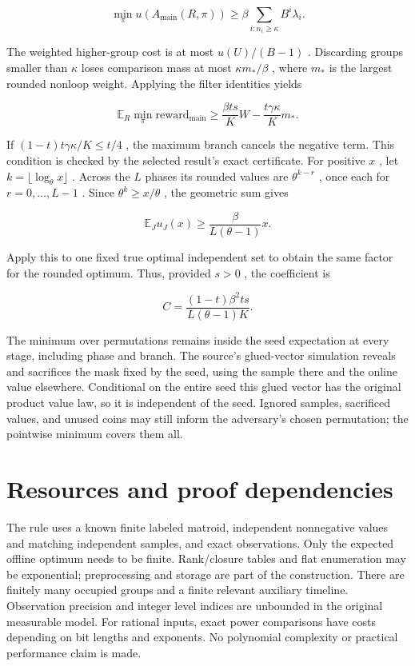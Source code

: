 \documentclass[11pt]{article}
\begin{document}
\[\min_\pi u(A_{\mathrm{main}}(R,\pi))
\ge\beta\sum_{i:n_i\ge\kappa}B^i\lambda_i.\]

The weighted higher-group cost is at most \(u(U)/(B-1)\) . Discarding groups smaller than \(\kappa\) loses comparison mass at most \(\kappa m_*/\beta\) , where \(m_*\) is the largest rounded nonloop weight. Applying the filter identities yields

\[\mathbb E_R\min_\pi\mathrm{reward}_{\mathrm{main}}
\ge\frac{\beta t s}{K}W-\frac{t\gamma\kappa}{K}m_*.\]

If \((1-t)t\gamma\kappa/K\le t/4\) , the maximum branch cancels the negative term. This condition is checked by the selected result's exact certificate. For positive \(x\) , let \(k=\lfloor\log_\theta x\rfloor\) . Across the \(L\) phases its rounded values are \(\theta^{k-r}\) , once each for \(r=0,\ldots,L-1\) . Since \(\theta^k\ge x/\theta\) , the geometric sum gives

\[\mathbb E_Ju_J(x)\ge\frac{\beta}{L(\theta-1)}x.\]

Apply this to one fixed true optimal independent set to obtain the same factor for the rounded optimum. Thus, provided \(s>0\) , the coefficient is

\[C=\frac{(1-t)\beta^2 t s}{L(\theta-1)K}.\]

The minimum over permutations remains inside the seed expectation at every stage, including phase and branch. The source's glued-vector simulation reveals and sacrifices the mask fixed by the seed, using the sample there and the online value elsewhere. Conditional on the entire seed this glued vector has the original product value law, so it is independent of the seed. Ignored samples, sacrificed values, and unused coins may still inform the adversary's chosen permutation; the pointwise minimum covers them all.

\section{Resources and proof dependencies}\label{resources-and-proof-dependencies}

The rule uses a known finite labeled matroid, independent nonnegative values and matching independent samples, and exact observations. Only the expected offline optimum needs to be finite. Rank/closure tables and flat enumeration may be exponential; preprocessing and storage are part of the construction. There are finitely many occupied groups and a finite relevant auxiliary timeline. Observation precision and integer level indices are unbounded in the original measurable model. For rational inputs, exact power comparisons have costs depending on bit lengths and exponents. No polynomial complexity or practical performance claim is made.
\end{document}
